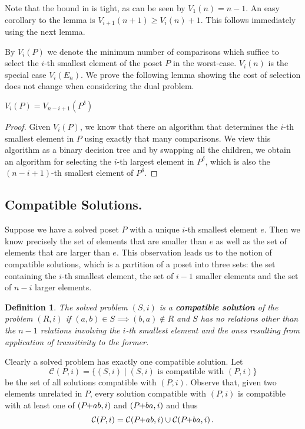 \documentclass[twoside,leqno,twocolumn]{article}
\newcommand{\pchild}[3]{{#1}\kern-1pt{+}{#2}{#3}}
\newcommand{\dual}[1]{{#1}^{\delta}}
\newtheorem{definition}{Definition}[section]
\begin{document}
Note that the bound in  is tight, as can be seen by $V_1(n) = n - 1$.
An easy corollary to the lemma is $V_{i + 1}(n + 1) \ge V_i(n) + 1$.
This follows immediately using the next lemma.

By $V_i(P)$ we denote the minimum number of comparisons which suffice to select the $i$-th smallest element of the poset $P$ in the worst-case.
$V_i(n)$ is the special case $V_i(E_n)$.
We prove the following lemma showing the cost of selection does not change when considering the dual problem.

\begin{lemma} \label{lemma:dual_poset_allowed}
  $V_i(P) = V_{n - i + 1}(\dual{P})$
\end{lemma}

\begin{proof}
  Given $V_i(P)$, we know that there an algorithm that determines the $i$-th smallest element in $P$ using exactly that many comparisons.
  We view this algorithm as a binary decision tree and by swapping all the children, we obtain an algorithm for selecting the $i$-th largest element in $\dual{P}$, which is also the $(n - i + 1)$-th smallest element of $\dual{P}$.
\end{proof}

\subsection{Compatible Solutions.}
Suppose we have a solved poset $P$ with a unique $i$-th smallest element $e$.
Then we know precisely the set of elements that are smaller than $e$ as well as the set of elements that are larger than $e$.
This observation leads us to the notion of compatible solutions, which is a partition of a poset into three sets: the set containing the $i$-th smallest element, the set of $i - 1$ smaller elements and the set of $n - i$ larger elements.

\begin{definition}%
  The solved problem $(S, i)$ is a \textbf{compatible solution} of the problem $(R, i)$ if $(a, b)\in S\implies (b, a)\notin R$ and $S$ has no relations other than the $n - 1$ relations involving the $i$-th smallest element and the ones resulting from application of transitivity to the former.
\end{definition}

Clearly a solved problem has exactly one compatible solution.
Let
\begin{equation*}
  \mathcal{C}(P, i) = \{(S, i) \mid (S, i) \text{ is compatible with } (P, i) \}
\end{equation*}
be the set of all solutions compatible with $(P, i)$.
Observe that, given two elements unrelated in $P$, every solution compatible with $(P, i)$ is compatible with at least one of $(\pchild{P}{a}{b}, i)$ and $(\pchild{P}{b}{a}, i)$ and thus
\begin{equation}\label{lemma:compatible_union}
  \mathcal{C}(P, i) = \mathcal{C}(\pchild{P}{a}{b}, i) \cup \mathcal{C}(\pchild{P}{b}{a}, i)\,\text{.}
\end{equation}
\end{document}
